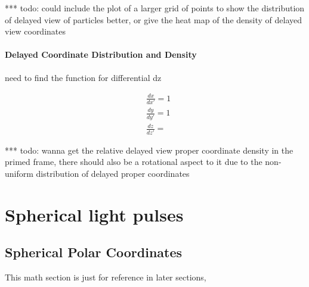 *** todo: could include the plot of a larger grid of points to show the distribution of delayed view of particles better, or give the heat map of the density of delayed view coordinates

\subsubsection{Delayed Coordinate Distribution and Density}

need to find the function for differential dz

\begin{equation}
	\begin{aligned}
		 & \frac{dx}{dx'} = 1 \\
		 & \frac{dy}{dy'} = 1 \\
		 & \frac{dz}{dz'} =
	\end{aligned}
\end{equation}

*** todo: wanna get the relative delayed view proper coordinate density in the primed frame, there should also be a rotational aspect to it due to the non-uniform distribution of delayed proper coordinates

\chapter{Spherical light pulses}

\section{Spherical Polar Coordinates}

This math section is just for reference in later sections,


